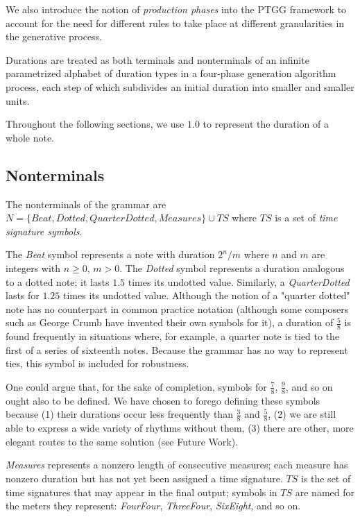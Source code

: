 \documentclass{article}
\begin{document}
We also introduce the notion of \emph{production phases} into the PTGG framework to account for the need for different rules to take place at different granularities in the generative process.

Durations are treated as both terminals and nonterminals of an infinite parametrized alphabet of duration types in a four-phase generation algorithm process, each step of which subdivides an initial duration into smaller and smaller units.

Throughout the following sections, we use $1.0$ to represent the duration of a whole note.

\subsection{Nonterminals}

The nonterminals of the grammar are $N=\{Beat,\allowbreak Dotted,\allowbreak QuarterDotted,\allowbreak Measures \} \cup TS$ where $TS$ is a set of \emph{time signature symbols}. 


The \emph{Beat} symbol represents a note with duration $2^n/m$ where $n$ and $m$ are integers with $n \geq 0$, $m > 0$. The \emph{Dotted} symbol represents a duration analogous to a dotted note; it lasts $1.5$ times its undotted value. Similarly, a \emph{QuarterDotted} lasts for $1.25$ times its undotted value. Although the notion of a "quarter dotted" note has no counterpart in common practice notation (although some composers such as George Crumb have invented their own symbols for it), a duration of $\frac{5}{8}$ is found frequently in situations where, for example, a quarter note is tied to the first of a series of sixteenth notes. Because the grammar has no way to represent ties, this symbol is included for robustness.

One could argue that, for the sake of completion, symbols for $\frac{7}{8}$, $\frac{9}{8}$, and so on ought also to be defined. We have chosen to forego defining these symbols because (1) their durations occur less frequently than $\frac{3}{8}$ and $\frac{5}{8}$, (2) we are still able to express a wide variety of rhythms without them, (3) there are other, more elegant routes to the same solution (see Future Work).


\emph{Measures} represents a nonzero length of consecutive measures; each measure has nonzero duration but has not yet been assigned a time signature. $TS$ is the set of time signatures that may appear in the final output; symbols in $TS$ are named for the meters they represent: \emph{FourFour}, \emph{ThreeFour}, \emph{SixEight}, and so on.
\end{document}
